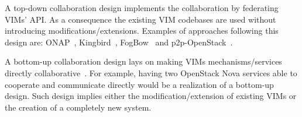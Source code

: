 A top-down collaboration design implements the collaboration by federating
VIMs' API. As a consequence the existing VIM codebases are used without introducing
modifications/extensions. Examples of approaches following this
design are: ONAP~\cite{onap}, Kingbird~\cite{kingbird},
FogBow~\cite{brasileiro2016fogbow} and p2p-OpenStack~\cite{ericsson-p2p}.

A bottom-up collaboration design lays on making VIMs
mechanisms/services directly collaborative~\cite{7923796}. For example, having two
OpenStack Nova services able to cooperate and communicate directly
would be a realization of a bottom-up design. Such design implies
either the modification/extension of existing VIMs or the creation of
a completely new system.
